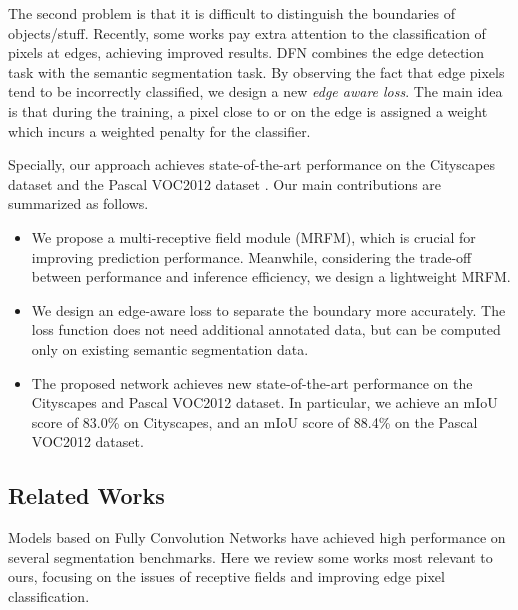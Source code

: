 \documentclass[final]{cvpr}
\begin{document}
The second problem is that it is difficult to distinguish the boundaries of objects/stuff. Recently, some works
pay extra attention to the classification of pixels at edges, achieving improved results.
DFN \cite{DFN} combines the edge detection task with the semantic segmentation task.
By observing the fact that edge pixels tend to be incorrectly classified, we design a new \emph{edge aware loss}.
The main idea is that during the training, a pixel close to or on the edge is assigned a weight which incurs a weighted penalty for the classifier.

Specially, our approach achieves state-of-the-art performance on the Cityscapes dataset \cite{cityscpaes} and the Pascal VOC2012 dataset \cite{everingham2012pascal}.
Our main contributions are summarized as follows.
\begin{itemize}
    \item We propose a multi-receptive field module (MRFM), which is crucial for improving prediction performance. Meanwhile, considering the trade-off between performance and inference efficiency, we design a lightweight MRFM.
    
    \item We design an edge-aware loss to separate the boundary more accurately. The loss function does not need additional annotated data, but can be computed only on existing semantic segmentation data.
    
    \item The proposed network achieves new state-of-the-art performance on the Cityscapes and Pascal VOC2012 dataset. In particular, we achieve an mIoU score of 83.0\% on Cityscapes, and an mIoU score of 88.4\% on the Pascal VOC2012 dataset.
    
\end{itemize}




\subsection{Related Works}

Models based on Fully Convolution Networks \cite{FCN1} have achieved high performance on several segmentation benchmarks\cite{everingham2012pascal,cityscpaes}. Here we review some works most relevant to ours, focusing on the issues of receptive fields and
improving edge pixel classification.
\end{document}
